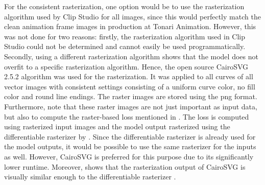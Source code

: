 For the consistent rasterization, one option would be to use the rasterization algorithm used by Clip Studio \citep{clipstudio} for all images, since this would perfectly match the clean animation frame images in production at Tonari Animation. However, this was not done for two reasons: firstly, the rasterization algorithm used in Clip Studio could not be determined and cannot easily be used programmatically. Secondly, using a different rasterization algorithm shows that the model does not overfit to a specific rasterization algorithm. Hence, the open source CairoSVG 2.5.2 \citep{cairosvg} algorithm was used for the rasterization. It was applied to all curves of all vector images with consistent settings consisting of a uniform curve color, no fill color and round line endings. The raster images are stored using the \gls{png} format. Furthermore, note that these raster images are not just important as input data, but also to compute the raster-based loss mentioned in . The loss is computed using rasterized input images and the model output rasterized using the differentiable rasterizer by \citet{Li:2020:DVG}. Since the differentiable rasterizer is already used for the model outputs, it would be possible to use the same rasterizer for the inputs as well. However, CairoSVG \citep{cairosvg} is preferred for this purpose due to its significantly lower runtime. Moreover,  shows that the rasterization output of CairoSVG \citep{cairosvg} is visually similar enough to the differentiable rasterizer \citep{Li:2020:DVG}.

